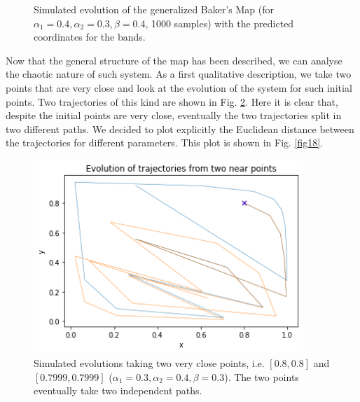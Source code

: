 \documentclass[11pt,titlepage]{article}
\begin{document}
\begin{center}
\begin{figure} [h]
		\hspace{8mm}
		\caption{Simulated evolution of the generalized Baker's Map (for $\alpha_1=0.4, \alpha_2=0.3, \beta=0.4$, 1000 samples) with the predicted coordinates for the bands.}
		\label{fig16}
	\end{figure}
\end{center}


Now that the general structure of the map has been described, we can analyse the chaotic nature of such system. As a first qualitative description, we take two points that are very close and look at the evolution of  the system for such initial points. Two trajectories of this kind are shown in Fig. \ref{fig17}. Here it is clear that, despite the initial points are very close, eventually the two trajectories split in two different paths. We decided to plot explicitly the Euclidean distance between the trajectories for different parameters. This plot is shown in Fig. \ref{fig18}.

\begin{center}
	\begin{figure} [h]
		\centering
		\includegraphics[width = 4in]{./figures/ex3_1_2.png}
		\caption{Simulated evolutions taking two very close points, i.e. $[0.8,0.8]$ and $[0.7999, 0.7999]$ ($\alpha_1=0.3, \alpha_2=0.4, \beta=0.3$). The two points eventually take two independent paths.}
		\label{fig17}
	\end{figure}
\end{center}
\end{document}

